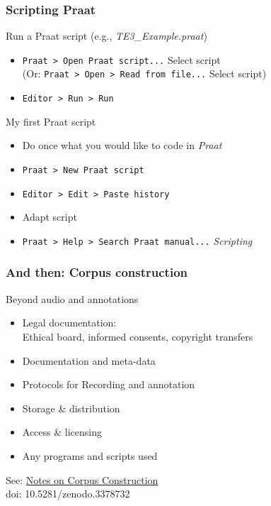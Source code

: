 \documentclass{beamer}
\begin{document}
\begin{frame} 
\frametitle{Scripting Praat} 
\begin{block}{Run a Praat script (e.g., \textit{TE3\_Example.praat})}
\begin{itemize} 
\item \texttt{Praat > Open Praat script...} Select script \\
      (Or: \texttt{Praat > Open > Read from file...} Select script)
\item \texttt{Editor > Run > Run}
\end{itemize}
\end{block} 

\begin{block}{My first Praat script}
\begin{itemize} 
\item Do once what you would like to code in \textit{Praat}
\item \texttt{Praat > New Praat script}
\item \texttt{Editor > Edit > Paste history}
\item Adapt script
\item \texttt{Praat > Help > Search Praat manual...} \textit{Scripting}
\end{itemize}
\end{block} 
\end{frame}

\begin{frame} 
\frametitle{And then: Corpus construction} 
\begin{block}{Beyond audio and annotations}
\begin{itemize} 
\item Legal documentation:\\ Ethical board, informed consents, copyright transfers
\item Documentation and meta-data
\item Protocols for Recording and annotation
\item Storage \& distribution
\item Access \& licensing
\item Any programs and scripts used
\end{itemize}
\end{block} 
\vskip 1cm
See: \href{http://www.fon.hum.uva.nl/rob/NotesOnCorpora/NotesOnCorpusConstruction.pdf}{Notes on Corpus Construction} \\
\scriptsize{doi: 10.5281/zenodo.3378732}
\end{frame}
\end{document}
